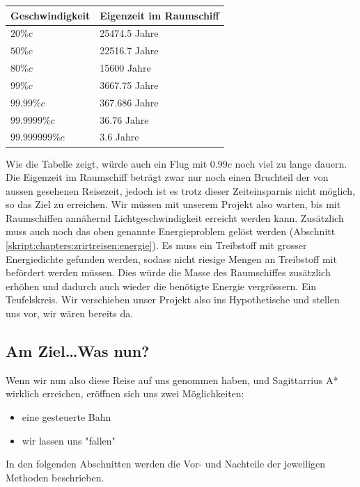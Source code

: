 \begin{refsection}
	\begin{center}
		\begin{tabular}{ | l | p{5cm} |}
			\hline
			Geschwindigkeit & Eigenzeit im Raumschiff \\ \hline
			$20\%c$ & 25474.5 Jahre \\ \hline
			$50\%c$ & 22516.7 Jahre \\ \hline
			$80\%c$ & 15600 Jahre \\ \hline
			$99\%c$ & 3667.75 Jahre \\ \hline
			$99.99\%c$ & 367.686 Jahre \\ \hline
			$99.9999\%c$ & 36.76 Jahre \\ \hline
			$99.999999\%c$ & 3.6 Jahre \\ \hline
		\end{tabular}
	\end{center}
	Wie die Tabelle zeigt, würde auch ein Flug mit $0.99c$ noch viel zu lange dauern. 
	Die Eigenzeit im Raumschiff beträgt zwar nur noch einen Bruchteil der von aussen gesehenen Reisezeit, jedoch ist es trotz dieser Zeiteinsparnis nicht möglich, so das Ziel zu erreichen.
	Wir müssen mit unserem Projekt also warten, bis mit Raumschiffen annähernd Lichtgeschwindigkeit erreicht werden kann. Zusätzlich muss auch noch das oben genannte Energieproblem gelöst werden (Abschnitt \ref{skript:chapters:zrirtreisen:energie}). Es muss ein Treibstoff mit grosser Energiedichte gefunden werden, sodass nicht riesige Mengen an Treibstoff mit befördert werden müssen. Dies würde die Masse des Raumschiffes zusätzlich erhöhen und dadurch auch wieder die benötigte Energie vergrössern. Ein Teufelskreis.
	Wir verschieben unser Projekt also ins Hypothetische und stellen uns vor, wir wären bereits da.
	
	\subsection{Am Ziel\dots Was nun?}
	
	Wenn wir nun also diese Reise auf uns genommen haben, und Sagittarrius A* wirklich erreichen, eröffnen sich uns zwei Möglichkeiten:
	\begin{itemize}
		\item eine gesteuerte Bahn
		\item wir lassen uns "fallen"
	\end{itemize}
	In den folgenden Abschnitten werden die Vor- und Nachteile der jeweiligen Methoden beschrieben.
	

\end{refsection}

